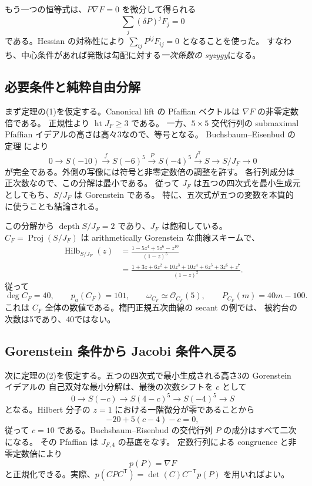 \documentclass[11pt,a4paper]{ltjsarticle}
\newcommand{\OO}{\mathcal O}\newcommand{\FF}{\mathcal F}
\theoremstyle{remark}\newtheorem{remark}[theorem]{注意}
\begin{document}
もう一つの恒等式は、$P\nabla F=0$ を微分して得られる
\begin{equation}\label{eq:div-syzygy}
               \sum_j(\delta P)^jF_j=0
\end{equation}
である。Hessian の対称性により $\sum_{ij}P^{ij}F_{ij}=0$ となることを使った。
すなわち、中心条件があれば発散は勾配に対する\emph{一次係数の syzygy}になる。

\subsection{必要条件と純粋自由分解}

まず定理の(1)を仮定する。Canonical lift の Pfaffian ベクトルは $\nabla F$ の非零定数倍である。
正規性より $\operatorname{ht}J_F\ge3$ である。
一方、$5\times5$ 交代行列の submaximal Pfaffian イデアルの高さは高々3なので、等号となる。
Buchsbaum--Eisenbud の定理 \cite{BE} により
\begin{equation}\label{eq:BE}
 0\longrightarrow S(-10)\xrightarrow{f}
 S(-6)^5\xrightarrow{P}S(-4)^5\xrightarrow{f^{\mathsf T}}S
 \longrightarrow S/J_F\longrightarrow0
\end{equation}
が完全である。外側の写像には符号と非零定数倍の調整を許す。
各行列成分は正次数なので、この分解は最小である。
従って $J_F$ は五つの四次式を最小生成元としてもち、$S/J_F$ は Gorenstein である。
特に、五次式が五つの変数を本質的に使うことも結論される。

この分解から $\operatorname{depth}S/J_F=2$ であり、$J_F$ は飽和している。
$C_F=\operatorname{Proj}(S/J_F)$ は arithmetically Gorenstein な曲線スキームで、
\begin{align*}
 \operatorname{Hilb}_{S/J_F}(z)
 &=\frac{1-5z^4+5z^6-z^{10}}{(1-z)^5}\\
 &=\frac{1+3z+6z^2+10z^3+10z^4+6z^5+3z^6+z^7}{(1-z)^2}.
\end{align*}
従って
\begin{equation}\label{eq:jacobian-invariants}
 \deg C_F=40,\qquad p_a(C_F)=101,\qquad
 \omega_{C_F}\simeq\OO_{C_F}(5),\qquad
 P_{C_F}(m)=40m-100.
\end{equation}
これは $C_F$ 全体の数値である。楕円正規五次曲線の secant の例では、
被約台の次数は5であり、40ではない。

\subsection{Gorenstein 条件から Jacobi 条件へ戻る}

次に定理の(2)を仮定する。五つの四次式で最小生成される高さ3の Gorenstein イデアルの
自己双対な最小分解は、最後の次数シフトを $c$ として
\[
 0\longrightarrow S(-c)\longrightarrow S(4-c)^5
 \longrightarrow S(-4)^5\longrightarrow S
\]
となる。Hilbert 分子の $z=1$ における一階微分が零であることから
\[
                         -20+5(c-4)-c=0,
\]
従って $c=10$ である。Buchsbaum--Eisenbud の交代行列 $P$ の成分はすべて二次になる。
その Pfaffian は $J_{F,4}$ の基底をなす。
定数行列による congruence と非零定数倍により
\[
                              p(P)=\nabla F
\]
と正規化できる。実際、$p(CPC^{\mathsf T})=\det(C)C^{-\mathsf T}p(P)$ を用いればよい。
\end{document}
